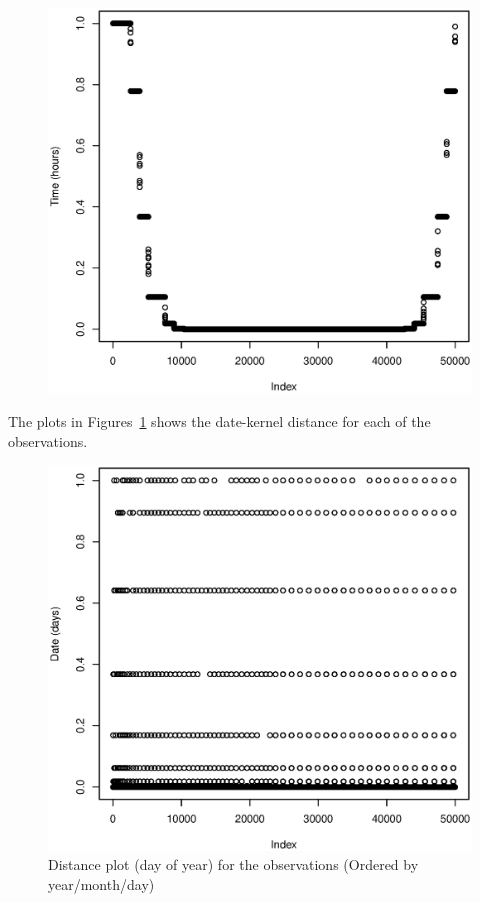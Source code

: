 \documentclass[a4paper, twocolumn]{article}
\begin{document}
\begin{figure}[!ht]
\begin{minipage}[]{0.2\textwidth}
	    \end{minipage}
	    \begin{minipage}[]{0.4\textwidth}
	    	\includegraphics[width=\textwidth]{share/9_time.eps}
	    \end{minipage}
    \end{figure}

    The plots in Figures~\ref{fig:day} shows the date-kernel distance for each of the observations.  
    \begin{figure}[!h]
    \centering
    \caption{Distance plot (day of year) for the observations (Ordered by year/month/day)\label{fig:day}}
	    \begin{minipage}[]{0.4\textwidth}
	    	\includegraphics[width=\textwidth]{share/1_date.eps}
	    \end{minipage}
    \end{figure}
\end{document}

